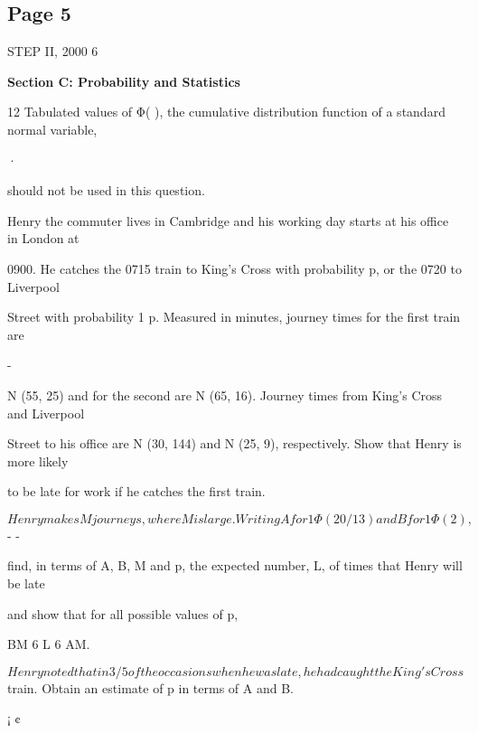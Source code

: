 \documentclass[12pt]{article}
\begin{document}
\subsection*{Page 5}
\begin{flushleft}
STEP II, 2000 6\par
\bigskip\textbf{Section C: Probability and Statistics}\par
12 Tabulated values of Φ( ), the cumulative distribution function of a standard normal variable,\par
·\par
should not be used in this question.\par
Henry the commuter lives in Cambridge and his working day starts at his office in London at\par
0900. He catches the 0715 train to King's Cross with probability p, or the 0720 to Liverpool\par
Street with probability 1 p. Measured in minutes, journey times for the first train are\par
-\par
N (55, 25) and for the second are N (65, 16). Journey times from King's Cross and Liverpool\par
Street to his office are N (30, 144) and N (25, 9), respectively. Show that Henry is more likely\par
to be late for work if he catches the first train.\par
\[Henry makes M journeys, where M is large. Writing A for 1 Φ(20/13) and B for 1 Φ(2),\]
- -\par
find, in terms of A, B, M and p, the expected number, L, of times that Henry will be late\par
and show that for all possible values of p,\par
BM 6 L 6 AM.\par
\[Henry noted that in 3/5 of the occasions when he was late, he had caught the King's Cross\]
train. Obtain an estimate of p in terms of A and B.\par
[A random variable is said to be N µ, σ2 if it has a normal distribution with mean µ and\par
variance σ2.] ¡ ¢\par
\end{flushleft}
\end{document}
